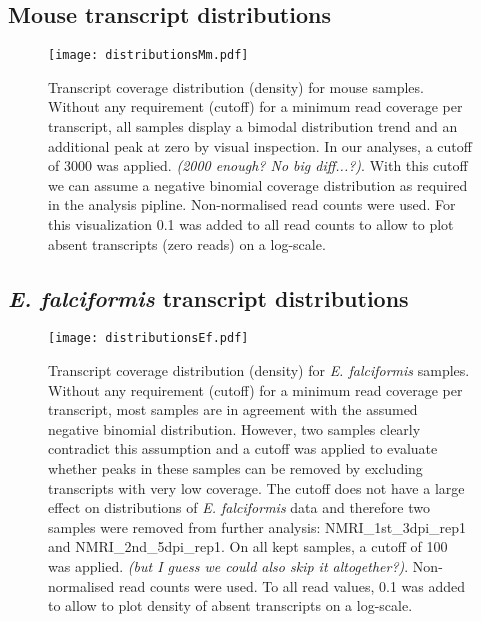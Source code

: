 \documentclass{article}
\begin{document}
\subsection{Mouse transcript distributions}
\begin{figure}[H]
\centering
\texttt{[image: distributionsMm.pdf]}
	\caption{Transcript coverage distribution (density) for mouse samples. 
 Without any requirement (cutoff) for a minimum read 
coverage per transcript, all samples display a bimodal distribution trend and an additional 
peak at zero by visual inspection. In our analyses, a cutoff of 3000 was applied. 
\emph{(2000 enough? No big diff...?)}. With this cutoff we can assume a negative binomial
coverage distribution as required in the analysis pipline. Non-normalised read counts were used.
For this visualization 0.1 was added to all read counts to allow to plot 
absent transcripts (zero reads) on a log-scale.}
\end{figure}

\clearpage
\subsection{\textit{E. falciformis} transcript distributions}
\begin{figure}[H]
\begin{center}
\texttt{[image: distributionsEf.pdf]}
\caption{Transcript coverage distribution (density) for \textit{E. falciformis} samples. Without any
requirement (cutoff) for a minimum read coverage per transcript, most samples are in agreement with
the assumed negative binomial distribution. However, two samples clearly contradict this assumption
and a cutoff was applied to evaluate whether peaks in these samples can be removed by excluding 
transcripts with very low coverage. The cutoff does not have a large effect on distributions 
of \textit{E. falciformis} data and therefore two samples were removed from further 
analysis: NMRI\_1st\_3dpi\_rep1 and NMRI\_2nd\_5dpi\_rep1. On all kept samples, a cutoff of 100 
was applied. \emph{(but I guess we could also skip it altogether?)}. Non-normalised read counts were used.
To all read values, 0.1 was added to allow to plot density of absent transcripts on a log-scale.}
\end{center}
\end{figure}

\end{document}
